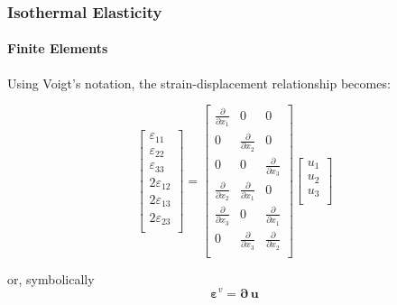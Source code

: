 \documentclass[10pt,xcolor=pdftex,dvipsnames,table]{beamer}
\begin{document}
\begin{frame}
	\frametitle{ Isothermal Elasticity }
	\framesubtitle{ Finite Elements }
	
	Using Voigt's notation, the strain-displacement relationship becomes:
	
	\begin{equation*}
		\begin{bmatrix}
			\varepsilon_{11} \\
			\varepsilon_{22} \\
			\varepsilon_{33} \\
			2\varepsilon_{12} \\
			2\varepsilon_{13} \\
			2\varepsilon_{23} \\	
		\end{bmatrix}
		=
		\begin{bmatrix}
			\frac{\partial}{\partial x_1} & 0 & 0 \\
			0 &\frac{\partial}{\partial x_2} &  0 \\
			0 & 0 & \frac{\partial}{\partial x_3}  \\
			\frac{\partial}{\partial x_2} & \frac{\partial}{\partial x_1} & 0  \\
			\frac{\partial}{\partial x_3} & 0 & \frac{\partial}{\partial x_1}  \\
			0 & \frac{\partial}{\partial x_3} & \frac{\partial}{\partial x_2}  \\
		\end{bmatrix}
		\begin{bmatrix}
			u_1 \\	
			u_2 \\	
			u_3 \\	
		\end{bmatrix}						
	\end{equation*}	
	
	or, symbolically
	\begin{equation*}
		\boldsymbol{\varepsilon}^v = \boldsymbol{\partial}\,\boldsymbol{u}
	\end{equation*}		
	
\end{frame}
\end{document}
